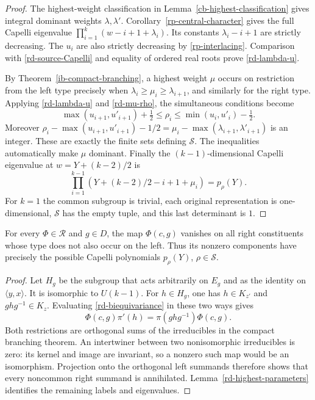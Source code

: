 \begin{proof}
The highest-weight classification in
Lemma~\ref{cb-highest-classification} gives integral
dominant weights $\lambda,\lambda'$.
Corollary~\ref{rp-central-character} gives the
full Capelli eigenvalue
$\prod_{i=1}^k(w-i+1+\lambda_i)$.
Its constants $\lambda_i-i+1$ are strictly
decreasing.  The $u_i$ are also strictly decreasing
by \eqref{rp-interlacing}.  Comparison with
\eqref{rd-source-Capelli} and equality of ordered
real roots prove \eqref{rd-lambda-u}.

By Theorem~\ref{ib-compact-branching}, a highest
weight $\mu$ occurs on restriction from the left
type precisely when
$\lambda_i\geq\mu_i\geq\lambda_{i+1}$, and similarly
for the right type.  Applying \eqref{rd-lambda-u}
and \eqref{rd-mu-rho}, the simultaneous conditions
become
\[
 \max(u_{i+1},u'_{i+1})+\tfrac12
          \leq \rho_i
          \leq \min(u_i,u'_i)-\tfrac12 .
\]
Moreover
$\rho_i-\max(u_{i+1},u'_{i+1})-1/2
=\mu_i-\max(\lambda_{i+1},\lambda'_{i+1})$
is an integer.  These are exactly the finite sets
defining $\mathcal S$.
The inequalities automatically make $\mu$ dominant.
Finally the $(k-1)$-dimensional Capelli eigenvalue
at $w=Y+(k-2)/2$ is
\[
 \prod_{i=1}^{k-1}(Y+(k-2)/2-i+1+\mu_i)
                                      =p_\rho(Y).
\]
For $k=1$ the common subgroup is trivial, each
original representation is one-dimensional,
$\mathcal S$ has the empty tuple, and this last
determinant is $1$.
\end{proof}

\begin{lemma}\label{rd-common-types}
For every $\Phi\in\mathscr R$ and $g\in D$,
the map $\Phi(c,g)$ vanishes on all right
constituents whose type does not also occur on
the left.  Thus its nonzero components have
precisely the possible Capelli polynomials
$p_\rho(Y)$, $\rho\in\mathcal S$.
\end{lemma}

\begin{proof}
Let $H_g$ be the subgroup that acts arbitrarily
on $E_g$ and as the identity on $\langle y,x\rangle$.
It is isomorphic to $U(k-1)$.
For $h\in H_g$, one has $h\in K_{z'}$ and
$ghg^{-1}\in K_z$.  Evaluating
\eqref{rd-biequivariance} in these two ways gives
\[
             \Phi(c,g)\pi'(h)
                 =\pi(ghg^{-1})\Phi(c,g).
\]
Both restrictions are orthogonal sums of the
irreducibles in the compact branching theorem.
An intertwiner between two nonisomorphic
irreducibles is zero: its kernel and image
are invariant, so a nonzero such map would
be an isomorphism.  Projection onto the
orthogonal left summands therefore shows that
every noncommon right summand is annihilated.
Lemma~\ref{rd-highest-parameters} identifies the
remaining labels and eigenvalues.
\end{proof}

